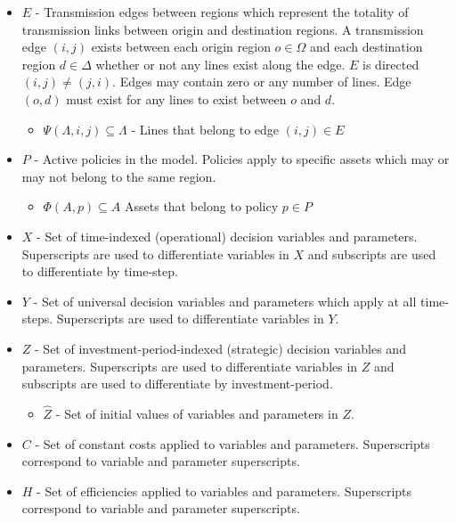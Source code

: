 \begin{itemize}
	\begin{itemize}
		\item $\Theta(A, r) \subseteq A$ Assets that belong to region $r \in R$
	\end{itemize}
	\item $E$ - Transmission edges between regions which represent the totality of transmission links between origin and destination regions. A transmission edge $(i, j)$ exists between each origin region $o \in \Omega$ and each destination region $d \in \Delta$ whether or not any lines exist along the edge. $E$ is directed $(i, j) \neq (j, i)$. Edges may contain zero or any number of lines. Edge $(o, d)$ must exist for any lines to exist between $o$ and $d$.
	\begin{itemize}
		\item $\Psi(\Lambda, i, j) \subseteq \Lambda$ - Lines that belong to edge $(i, j) \in E$
	\end{itemize}
	\item $P$ - Active policies in the model. Policies apply to specific assets which may or may not belong to the same region.
	\begin{itemize}
		\item $\Phi(A, p) \subseteq A$ Assets that belong to policy $p \in P$
	\end{itemize}
	\item $X$ - Set of time-indexed (operational) decision variables and parameters. Superscripts are used to differentiate variables in $X$ and subscripts are used to differentiate by time-step.
	\item $Y$ - Set of universal decision variables and parameters which apply at all time-steps. Superscripts are used to differentiate variables in $Y$.
	\item $Z$ - Set of investment-period-indexed (strategic) decision variables and parameters. Superscripts are used to differentiate variables in $Z$ and subscripts are used to differentiate by investment-period.
	\begin{itemize}
		\item $\hat{Z}$ - Set of initial values of variables and parameters in $Z$.
	\end{itemize}
	\item $C$ - Set of constant costs applied to variables and parameters. Superscripts correspond to variable and parameter superscripts.
	\item $H$ - Set of efficiencies applied to variables and parameters. Superscripts correspond to variable and parameter superscripts.
\end{itemize}

